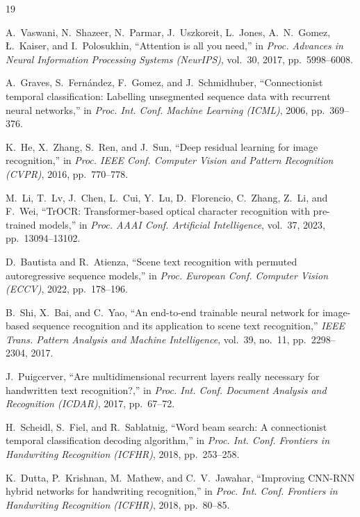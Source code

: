 \documentclass[conference]{IEEEtran}
\begin{document}
\begin{thebibliography}{19}

A.~Vaswani, N.~Shazeer, N.~Parmar, J.~Uszkoreit, L.~Jones, A.~N.~Gomez, {\L}.~Kaiser, and I.~Polosukhin, ``Attention is all you need,'' in \textit{Proc. Advances in Neural Information Processing Systems (NeurIPS)}, vol.~30, 2017, pp.~5998--6008.

A.~Graves, S.~Fern{\'a}ndez, F.~Gomez, and J.~Schmidhuber, ``Connectionist temporal classification: Labelling unsegmented sequence data with recurrent neural networks,'' in \textit{Proc. Int. Conf. Machine Learning (ICML)}, 2006, pp.~369--376.

K.~He, X.~Zhang, S.~Ren, and J.~Sun, ``Deep residual learning for image recognition,'' in \textit{Proc. IEEE Conf. Computer Vision and Pattern Recognition (CVPR)}, 2016, pp.~770--778.

M.~Li, T.~Lv, J.~Chen, L.~Cui, Y.~Lu, D.~Florencio, C.~Zhang, Z.~Li, and F.~Wei, ``TrOCR: Transformer-based optical character recognition with pre-trained models,'' in \textit{Proc. AAAI Conf. Artificial Intelligence}, vol.~37, 2023, pp.~13094--13102.

D.~Bautista and R.~Atienza, ``Scene text recognition with permuted autoregressive sequence models,'' in \textit{Proc. European Conf. Computer Vision (ECCV)}, 2022, pp.~178--196.

B.~Shi, X.~Bai, and C.~Yao, ``An end-to-end trainable neural network for image-based sequence recognition and its application to scene text recognition,'' \textit{IEEE Trans. Pattern Analysis and Machine Intelligence}, vol.~39, no.~11, pp.~2298--2304, 2017.

J.~Puigcerver, ``Are multidimensional recurrent layers really necessary for handwritten text recognition?,'' in \textit{Proc. Int. Conf. Document Analysis and Recognition (ICDAR)}, 2017, pp.~67--72.

H.~Scheidl, S.~Fiel, and R.~Sablatnig, ``Word beam search: A connectionist temporal classification decoding algorithm,'' in \textit{Proc. Int. Conf. Frontiers in Handwriting Recognition (ICFHR)}, 2018, pp.~253--258.

K.~Dutta, P.~Krishnan, M.~Mathew, and C.~V.~Jawahar, ``Improving CNN-RNN hybrid networks for handwriting recognition,'' in \textit{Proc. Int. Conf. Frontiers in Handwriting Recognition (ICFHR)}, 2018, pp.~80--85.


\end{thebibliography}
\end{document}
